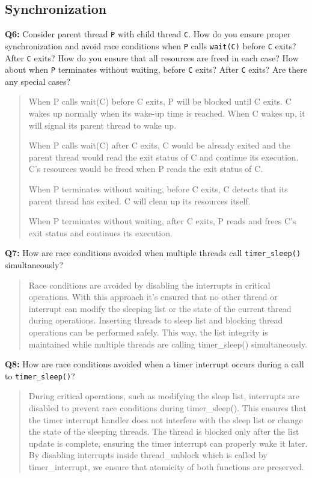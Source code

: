 \documentclass[a4paper,11pt]{paper}
\begin{document}
\subsection{Synchronization}

\textbf{Q6:} Consider parent thread \texttt{P} with child thread \texttt{C}.  How do you ensure proper synchronization and avoid race conditions when \texttt{P} calls \texttt{wait(C)} before \texttt{C} exits?  After \texttt{C} exits?  How do you ensure that all resources are freed in each case?  How about when \texttt{P} terminates without waiting, before \texttt{C} exits?  After \texttt{C} exits?  Are there any special cases?
\begin{quote}
  When P calls wait(C) before C exits, P will be blocked until C exits. C wakes up
normally when its wake-up time is reached. When C wakes up, it will signal its parent
thread to wake up.

When P calls wait(C) after C exits, C would be already exited and the parent thread
would read the exit status of C and continue its execution. C's resources would be
freed when P reads the exit status of C. 

When P terminates without waiting, before C exits, C detects that its parent thread
has exited. C will clean up its resources itself. 

When P terminates without waiting, after C exits, P reads and frees C's exit status and 
continues its execution.
\end{quote}

\textbf{Q7:} How are race conditions avoided when multiple threads call \texttt{timer\_sleep()} simultaneously?
\begin{quote}
Race conditions are avoided by disabling the interrupts in critical operations.
	With this approach it’s ensured that no other thread or interrupt can modify
	the sleeping list or the state of the current thread during operations. Inserting
	threads to sleep list and blocking thread operations can be performed safely.
	This way, the list integrity is maintained while multiple threads are calling
	timer\_sleep() simultaneously.
\end{quote}

\textbf{Q8:} How are race conditions avoided when a timer interrupt occurs during a call to \texttt{timer\_sleep()}?
\begin{quote}
During critical operations, such as modifying the sleep list, interrupts are
disabled to prevent race conditions during timer\_sleep(). This ensures that the
timer interrupt handler does not interfere with the sleep list or change the
state of the sleeping threads. The thread is blocked only after the list update is complete, ensuring the timer interrupt can properly wake it later. By disabling interrupts inside thread\_unblock which is called by timer\_interrupt, we ensure that atomicity of both functions
	are preserved.
\end{quote}
\end{document}

